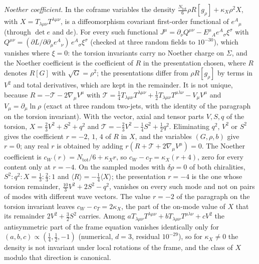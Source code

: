 \emph{Noether coefficient.} In the coframe variables the density \(\tfrac{N_{\mathrm{tot}}}6\rho R[g_\rho]+\kappa_X\rho^2X\), with \(X=T_{\lambda\mu\nu}T^{\lambda\mu\nu}\), is a diffeomorphism covariant first-order functional of \(e^A{}_\mu\) (through \(\det e\) and \(\mathrm de\)). For every such functional \(J^\mu=\partial_\nu Q^{\mu\nu}-E^\mu{}_Ae^A{}_\sigma\xi^\sigma\) with \(Q^{\mu\nu}=(\partial L/\partial\partial_\mu e^A{}_\nu)\,e^A{}_\sigma\xi^\sigma\) (checked at three random fields to \(10^{-30}\)), which vanishes where \(\xi=0\): the torsion invariants carry no Noether charge on \(\Sigma\), and the Noether coefficient is the coefficient of \(R\) in the presentation chosen, where \(R\) denotes \(R[G]\) with \(\sqrt G=\rho^2\); the presentations differ from \(\rho R[g_\rho]\) by terms in \(V^2\) and total derivatives, which are kept in the remainder. It is not unique, because \(R=-\mathcal T-2\nabla_\mu V^\mu\) with \(\mathcal T=\tfrac14T_{\lambda\mu\nu}T^{\lambda\mu\nu}+\tfrac12T_{\lambda\mu\nu}T^{\mu\lambda\nu}-V_\mu V^\mu\) and \(V_\mu=\partial_\mu\ln\rho\) (exact at three random two-jets, with the identity of the paragraph on the torsion invariant). With the vector, axial and tensor parts \(V,S,q\) of the torsion, \(X=\tfrac23V^2+S^2+q^2\) and \(\mathcal T=-\tfrac23V^2-\tfrac14S^2+\tfrac12q^2\). Eliminating \(q^2\), \(V^2\) or \(S^2\) gives the coefficient \(r=-2\), \(1\), \(4\) of \(R\) in \(X\), and the variables \((G,\rho,b)\) give \(r=0\); any real \(r\) is obtained by adding \(r(R+\mathcal T+2\nabla_\mu V^\mu)=0\). The Noether coefficient is \(c_W(r)=N_{\mathrm{tot}}/6+\kappa_Xr\), so \(c_W-c_T=\kappa_X(r+4)\), zero for every content only at \(r=-4\). On the sampled modes with \(\delta\rho=0\) of both chiralities, \(S^2:q^2:X=\tfrac13:\tfrac23:1\) and \(\langle R\rangle=-\tfrac14\langle X\rangle\); the presentation \(r=-4\) is the one whose torsion remainder, \(\tfrac{10}3V^2+2S^2-q^2\), vanishes on every such mode and not on pairs of modes with different wave vectors. The value \(r=-2\) of the paragraph on the torsion invariant leaves \(c_W-c_T=2\kappa_X\), the part of the on-mode value of \(X\) that its remainder \(2V^2+\tfrac32S^2\) carries. Among \(aT_{\lambda\mu\nu}T^{\lambda\mu\nu}+bT_{\lambda\mu\nu}T^{\mu\lambda\nu}+cV^2\) the antisymmetric part of the frame equation vanishes identically only for \((a,b,c)\propto(\tfrac14,\tfrac12,-1)\) (numerical, \(d=3\), residual \(10^{-29}\)), so for \(\kappa_X\ne0\) the density is not invariant under local rotations of the frame, and the class of \(X\) modulo that direction is canonical.

